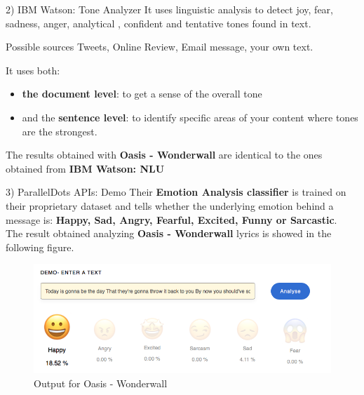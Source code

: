 \documentclass[xcolor=dvipsnames]{beamer}
\begin{document}
\begin{frame}{2) IBM Watson: Tone Analyzer}
It uses linguistic analysis to detect joy, fear, sadness, anger, analytical , confident and tentative tones found in text. \cite{p3}
\begin{block}{Possible sources}
Tweets, Online Review, Email message, your own text.
\end{block}
It uses both:
\begin{itemize}
\item \textbf{the document level}: to get a sense of the overall tone 
\item and the \textbf{sentence level}: to identify specific areas of your content where tones are the strongest.
\end{itemize}
The results obtained with \textbf{Oasis - Wonderwall} are identical to the ones obtained from \textbf{IBM Watson: NLU}

\end{frame}

\begin{frame}{3) ParallelDots APIs: Demo}
Their \textbf{Emotion Analysis classifier} is trained on their proprietary dataset and tells whether the underlying emotion behind a message is: \textbf{Happy, Sad, Angry, Fearful, Excited, Funny or Sarcastic}.\cite{p4}
\\The result obtained analyzing \textbf{Oasis - Wonderwall} lyrics is showed in the following figure. 
\begin{figure}
	\includegraphics[scale=0.3]{./images/pd_wonderwall}
	\caption{Output for Oasis - Wonderwall}
\end{figure}
\end{frame}
\end{document}
